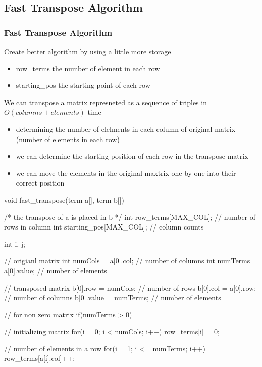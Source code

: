 \documentclass[newPxFont,sthlmFooter,nooffset]{beamer}
\begin{document}
\subsection{Fast Transpose Algorithm}
\begin{frame}
  \frametitle{Fast Transpose Algorithm}



Create better algorithm by using a little more storage
\begin{itemize}
\item row\_terms the number of element in each row
\item starting\_pos the starting point of each row
\end{itemize}


We can transpose a matrix represneted as a sequence of triples in $O(columns + elements)$ time
\begin{itemize}
  \item determining the number of elelments in each column of original matrix (number of elements in each row)
  \item we can determine the starting position of each row in the transpose matrix
  \item we can move the elements in the original maxtrix one by one into their correct position
\end{itemize}

\framebreak


\begin{ncodedef}
void fast_transpose(term a[], term b[]){

    /* the transpose of a is placed in b */
    int row_terms[MAX_COL];    // number of rows in column
    int starting_pos[MAX_COL]; // column counts
    
    int i, j;

    // origianl matrix 
    int numCols = a[0].col;    // number of columns
    int numTerms = a[0].value; // number of elements

    // transposed matrix
    b[0].row = numCols;        // number of rows       
    b[0].col = a[0].row;        // number of columns
    b[0].value = numTerms;     // number of elements
    
    // for non zero matrix
    if(numTerms > 0) {       
        // initializing matrix
        for(i = 0; i < numCols; i++) 
            row_terms[i] = 0;

        // number of elements in a row
        for(i = 1; i <= numTerms; i++)
            row_terms[a[i].col]++;

}}
\end{ncodedef}
\end{frame}
\end{document}
